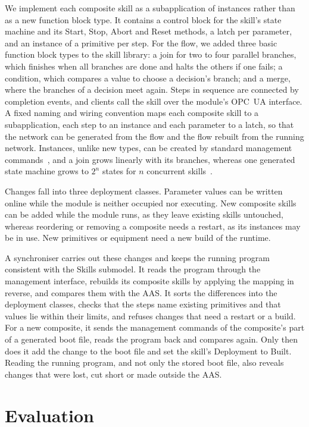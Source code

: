 \documentclass[5p,times,procedia]{elsarticle}
\begin{document}
We implement each composite skill as a subapplication of instances rather than as a new function block type. It contains a control block for the skill's state machine and its Start, Stop, Abort and Reset methods, a latch per parameter, and an instance of a primitive per step. For the flow, we added three basic function block types to the skill library: a join for two to four parallel branches, which finishes when all branches are done and halts the others if one fails; a condition, which compares a value to choose a decision's branch; and a merge, where the branches of a decision meet again. Steps in sequence are connected by completion events, and clients call the skill over the module's OPC~UA interface. A fixed naming and wiring convention maps each composite skill to a subapplication, each step to an instance and each parameter to a latch, so that the network can be generated from the flow and the flow rebuilt from the running network. Instances, unlike new types, can be created by standard management commands~\cite{iec61499}, and a join grows linearly with its branches, whereas one generated state machine grows to $2^n$ states for $n$ concurrent skills~\cite{dorofeev2021orchestrator}.

Changes fall into three deployment classes. Parameter values can be written online while the module is neither occupied nor executing. New composite skills can be added while the module runs, as they leave existing skills untouched, whereas reordering or removing a composite needs a restart, as its instances may be in use. New primitives or equipment need a new build of the runtime.

A synchroniser carries out these changes and keeps the running program consistent with the Skills submodel. It reads the program through the management interface, rebuilds its composite skills by applying the mapping in reverse, and compares them with the AAS. It sorts the differences into the deployment classes, checks that the steps name existing primitives and that values lie within their limits, and refuses changes that need a restart or a build. For a new composite, it sends the management commands of the composite's part of a generated boot file, reads the program back and compares again. Only then does it add the change to the boot file and set the skill's Deployment to Built. Reading the running program, and not only the stored boot file, also reveals changes that were lost, cut short or made outside the AAS.

\section{Evaluation}
\label{sec:evaluation}
\end{document}
